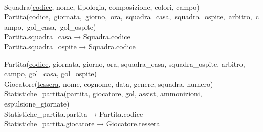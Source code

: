 \documentclass[11pt, openany]{article}
\theoremstyle{definition}
\theoremstyle{plain}
\theoremstyle{remark}
\begin{document}
			\vspace{.3cm}
			\\\vspace{.2cm}
			Squadra(\underline{codice}, nome, tipologia, composizione, colori, campo)\\
			\mbox{Partita(\underline{codice}, giornata, giorno, ora, squadra\_casa, squadra\_ospite, arbitro, campo, gol\_casa, gol\_ospite)}\\
			Partita.squadra\_casa → Squadra.codice\\
			Partita.squadra\_ospite → Squadra.codice

			\vspace{.3cm}
			\begin{minipage}[b]{6cm}
			\end{minipage}
			\begin{minipage}[b]{10cm}
				\begin{flushright}
					Partita(\underline{codice}, giornata, giorno, ora, squadra\_casa, squadra\_ospite, arbitro, campo, gol\_casa, gol\_ospite)\\
					Giocatore(\underline{tessera}, nome, cognome, data, genere,	squadra, numero)\\
					Statistiche\_partita(\underline{partita}, \underline{giocatore}, gol, assist, ammonizioni, espulsione\_giornate)\\
					Statistiche\_partita.partita → Partita.codice\\
					Statistiche\_partita.giocatore → Giocatore.tessera
				\end{flushright}
			\end{minipage}
			
\end{document}
